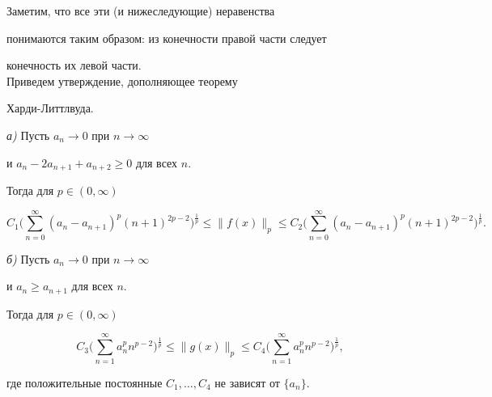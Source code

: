 Заметим, что все эти (и нижеследующие) неравенства 


понимаются таким образом: из конечности правой части следует


конечность их левой части.\\





Приведем утверждение, дополняющее теорему


Харди-Литтлвуда.








\begin{thmnonum}


{\em а)} Пусть $a_n\to 0$ при $n\to \infty$


и $a_n-2a_{n+1}+a_{n+2}\geq 0$ для всех $n$.





Тогда для $p\in (0,\infty)$


$$


C_1\bigg(\sum\limits_{n=0}^{\infty}(a_n-a_{n+1})^p(n+1)^{2p-2}


\bigg)^{\frac{1}{p}}


\leq \|f(x)\|_p \leq C_2 \bigg(\sum\limits_{n=0}^{\infty}(a_n-


a_{n+1})^p(n+1)^{2p-2}\bigg)^{\frac{1}{p}}.


$$





{\em б)} Пусть $a_n\to 0$ при $n\to \infty$


и $a_n\geq a_{n+1}$ для всех $n$.





Тогда для $p\in (0,\infty)$


$$


C_3\bigg(\sum\limits_{n=1}^{\infty}a_n^pn^{p-2}\bigg)^{\frac{1}{p}}


\leq \|g(x)\|_p \leq C_4 \bigg(\sum\limits_{n=1}^{\infty}


a_n^pn^{p-2}\bigg)^{\frac{1}{p}},


$$


где положительные постоянные $C_1,\dots,C_4$ не зависят от $\{a_n\}$.


\end{thmnonum}





